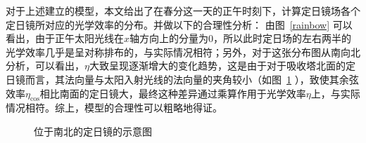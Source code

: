 \documentclass[../main.tex]{subfiles}
\begin{document}
对于上述建立的模型，本文给出了在春分这一天的正午时刻下，计算定日镜场各个定日镜所对应的光学效率的分布。并做以下的合理性分析：
由图~\ref{rainbow} 可以看出，由于正午太阳光线在\(x\)轴方向上的分量为\(0\)，所以此时定日场的左右两半的光学效率几乎是呈对称排布的，与实际情况相符；另外，对于这张分布图从南向北分析，可以看出，\(\eta\)大致呈现逐渐增大的变化趋势，这是由于对于吸收塔北面的定日镜而言，其法向量与太阳入射光线的法向量的夹角较小（如图~\ref{north_south} ），致使其余弦效率\(\eta_{\cos}\)相比南面的定日镜大，最终这种差异通过乘算作用于光学效率\(\eta\)上，与实际情况相符。综上，模型的合理性可以粗略地得证。
%
\begin{figure}[H]
\centering

\caption{\kaishu 位于南北的定日镜的示意图}\label{north_south}
\end{figure}
\end{document}
